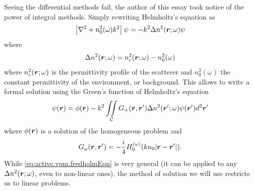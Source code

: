 %

Seeing the differential methods fail, the author of this essay
took notice of the power of integral methods. Simply rewriting Helmholtz's 
equation as
  \begin{equation}
   \left[\nabla^2+n_0^2(\omega)k^2\right]\psi=-k^2\Delta n^2(\boldsymbol{r};\omega)\psi
  \end{equation}
where 
  \begin{equation}
  	\Delta n^2(\boldsymbol{r};\omega)=n_c^2(\boldsymbol{r};\omega)-n_0^2(\omega)
  \end{equation}
where $n_c^2(\boldsymbol{r};\omega)$ is the permittivity profile of the scatterer
and $n^2_0(\omega)$ the constant permittivity of the environment, or background.
This allows to write a formal solution using the Green's function of Helmholtz's equation
  \begin{equation}
  	\label{eq:active.vpm.fredholmEqn}
  	\psi(\boldsymbol{r}) = \phi(\boldsymbol{r}) - k^2\mathop{\iint}_\mathcal{C}G_{+}(\boldsymbol{r},\boldsymbol{r}')\Delta n^2(\boldsymbol{r}';\omega)\psi(\boldsymbol{r}')d^2\boldsymbol{r}'
  \end{equation}
where $\phi(\boldsymbol{r})$ is a solution of the homogeneous problem and
  \begin{equation}
  	G_\omega(\boldsymbol{r},\boldsymbol{r}') = -\frac{i}{4}H_0^{(\omega)}(kn_0|\boldsymbol{r}-\boldsymbol{r}'|).
  \end{equation}
While \eqref{eq:active.vpm.fredholmEqn} is very general (it can be applied to 
any $\Delta n^2(\boldsymbol{r};\omega)$, even to non-linear ones),
the method of solution we will use restricts us to linear problems.

